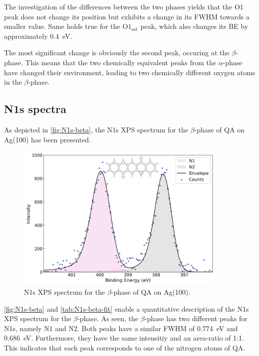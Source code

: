 The investigation of the differences between the two phases yields that the O1 peak does not change its position but exhibits a change in its \ac{FWHM} towards a smaller value. Same holds true for the $\mathrm{O1_{sat}}$ peak, which also changes its \ac{BE} by approximately 0.4~\si{\eV}.

The most significant change is obviously the second peak, occuring at the $\beta$-phase. This means that the two chemically equivalent peaks from the $\alpha$-phase have changed their environment, leading to two chemically different oxygen atoms in the $\beta$-phase.

\cleardoublepage
\subsection{N1s spectra}

As depicted in \autoref{fig:N1s-beta}, the N1s \ac{XPS} spectrum for the $\beta$-phase of \ac{QA} on Ag(100) has been presented.

\begin{figure}[H]
	\centering
	\includegraphics[width=0.9\textwidth]{images/N1s-beta.png}
	\caption{N1s \ac{XPS} spectrum for the $\beta$-phase of \ac{QA} on Ag(100).}
	\label{fig:N1s-beta}
\end{figure}

\autoref{fig:N1s-beta} and \autoref{tab:N1s-beta-fit} enable a quantitative description of the N1s \ac{XPS} spectrum for the $\beta$-phase. As seen, the $\beta$-phase has two different peaks for N1s, namely N1 and N2. Both peaks have a similar \ac{FWHM} of 0.774~\si{\eV} and 0.686~\si{\eV}. Furthermore, they have the same intensitiy and an area-ratio of 1:1. This indicates that each peak corresponds to one of the nitrogen atoms of \ac{QA}.

